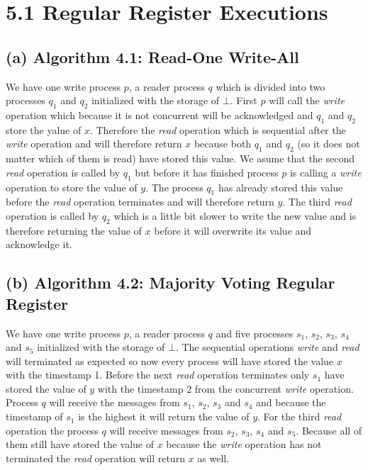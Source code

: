 \documentclass{article}
\begin{document}
	\pagestyle{fancy}
	\section*{5.1 Regular Register Executions}
	\begin{adjustwidth}{2em}{2em}
		\subsection*{(a) Algorithm 4.1: Read-One Write-All}
		\begin{adjustwidth}{1em}{2em}
			We have one write process $p$, a reader process $q$ which is divided into two processes $q_1$ and $q_2$ initialized with the storage of $\bot$. First $p$ will call the \textit{write} operation which because it is not concurrent will be acknowledged and $q_1$ and $q_2$ store the yalue of $x$. Therefore the \textit{read} operation which is sequential after the \textit{write} operation and will therefore return $x$ because both $q_1$ and $q_2$ (so it does not matter which of them is read) have stored this value. We asume that the second \textit{read} operation is called by $q_1$ but before it has finished process $p$ is calling a \textit{write} operation to store the value of $y$. The process $q_1$ has already stored this value before the \textit{read} operation terminates and will therefore return $y$. The third \textit{read} operation is called by $q_2$ which is a little bit slower to write the new value and is therefore returning the value of $x$ before it will overwrite its value and acknowledge it.
		\end{adjustwidth}
		\subsection*{(b) Algorithm 4.2: Majority Voting Regular Register}
		\begin{adjustwidth}{1em}{2em}
			We have one write process $p$, a reader process $q$ and five processes $s_1$, $s_2$, $s_3$, $s_4$ and $s_5$ initialized with the storage of $\bot$. The sequential operations \textit{write} and \textit{read} will terminated as expected so now every process will have stored the value $x$ with the timestamp 1. Before the next \textit{read} operation terminates only $s_1$ have stored the value of $y$ with the timestamp 2 from the concurrent \textit{write} operation. Process $q$ will receive the messages from $s_1$, $s_2$, $s_3$ and $s_4$ and because the timestamp of $s_1$ is the highest it will return the value of $y$. For the third \textit{read} operation the process $q$ will receive messages from $s_2$, $s_3$, $s_4$ and $s_5$. Because all of them still have stored the value of $x$ because the \textit{write} operation has not terminated the \textit{read} operation will return $x$ as well.
		\end{adjustwidth}
	\end{adjustwidth}
	
\end{document}

